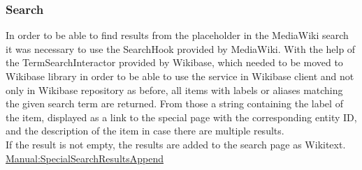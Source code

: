 \subsubsection{Search}
In order to be able to find results from the placeholder in the MediaWiki search it was necessary to use the SearchHook provided by MediaWiki.
With the help of the TermSearchInteractor provided by Wikibase, which needed to be moved to Wikibase library in order to be able to use the service in Wikibase client and not only in Wikibase repository as before, all items with labels or aliases matching the given search term are returned. From those a string containing the label of the item, displayed as a link to the special page with the corresponding entity ID, and the description of the item in case there are multiple results.  \\
If the result is not empty, the results are added to the search page as Wikitext. \\
\href{https://www.mediawiki.org/wiki/Manual:Hooks/SpecialSearchResultsAppend}{Manual:SpecialSearchResultsAppend}